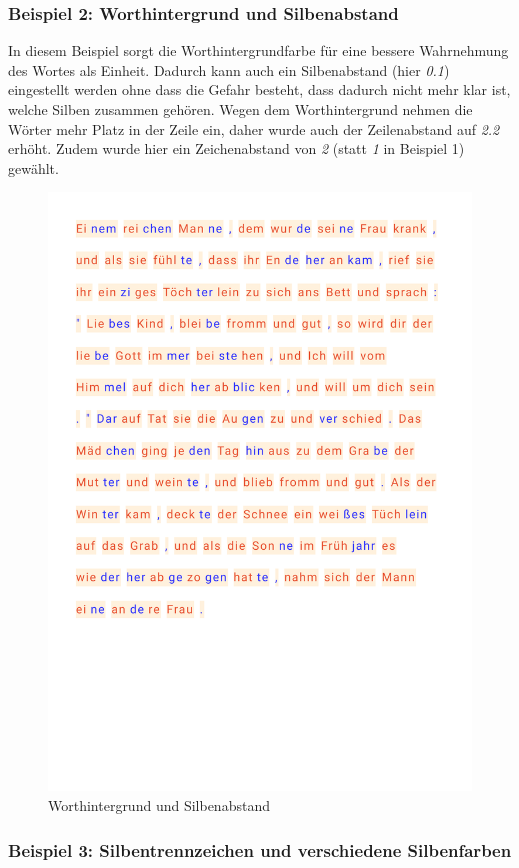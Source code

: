 \subsubsection{Beispiel 2: Worthintergrund und Silbenabstand}

In diesem Beispiel sorgt die Worthintergrundfarbe für eine bessere Wahrnehmung des Wortes als Einheit. Dadurch kann auch ein Silbenabstand (hier \textit{0.1}) eingestellt werden ohne dass die Gefahr besteht, dass dadurch nicht mehr klar ist, welche Silben zusammen gehören. Wegen dem Worthintergrund nehmen die Wörter mehr Platz in der Zeile ein, daher wurde auch der Zeilenabstand auf \textit{2.2} erhöht. Zudem wurde hier ein Zeichenabstand von \textit{2} (statt \textit{1} in Beispiel 1) gewählt.

\begin{figure}[h!]
	\centering
	\includegraphics[width=.7\linewidth, frame]{figures/evaluation/annotation2}
	\caption{Worthintergrund und Silbenabstand}
	\label{fig:evaluation-ex2}
\end{figure}
\newpage

\subsubsection{Beispiel 3:  Silbentrennzeichen und verschiedene Silbenfarben}

